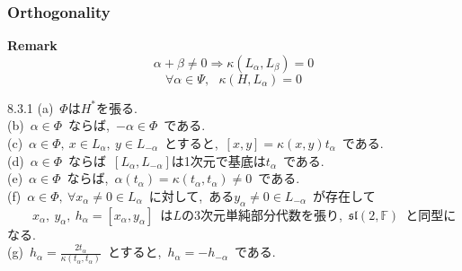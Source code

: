 \documentclass[uplatex,dvipdfmx]{jsarticle}
\begin{document}
\subsubsection{Orthogonality}
\textbf{Remark}\\
\begin{equation*}
    \alpha + \beta \neq 0 \Rightarrow \kappa(L_\alpha, L_\beta) = 0
\end{equation*}
\begin{equation*}
    \forall \alpha \in \Psi,~~~\kappa(H,L_\alpha) = 0
\end{equation*}
\begin{myprop}{8.3.1}
    (a)~$\Phi$は$H^*$を張る.\\
    (b)~$\alpha \in \Phi$~ならば,~$-\alpha \in \Phi$~である.\\
    (c)~$\alpha \in \Phi,~x\in L_\alpha,~y\in L_{-\alpha}$~とすると,~$[x,y] = \kappa(x,y) t_\alpha$~である.\\
    (d)~$\alpha \in \Phi$~ならば~$[L_\alpha, L_{-\alpha}]$は1次元で基底は$t_\alpha$~である.\\
    (e)~$\alpha \in \Phi$~ならば,~$\alpha(t_\alpha) = \kappa(t_\alpha, t_\alpha) \neq 0$~である.\\
    (f)~$\alpha \in \Phi,~\forall x_\alpha \neq 0 \in L_\alpha$~に対して,~ある$y_\alpha \neq 0 \in L_{-\alpha}$~が存在して\\
    ~~~~$x_\alpha,~y_\alpha,~h_\alpha = [x_\alpha, y_\alpha]$~は$L$の3次元単純部分代数を張り,~$\mathfrak{sl}(2,\mathbb{F})$~と同型になる.\\
    (g)~$h_\alpha = \frac{2t_\alpha}{\kappa(t_\alpha, t_\alpha)}$~とすると,~$h_\alpha  = - h_{-\alpha}$~である.
\end{myprop}
\end{document}
